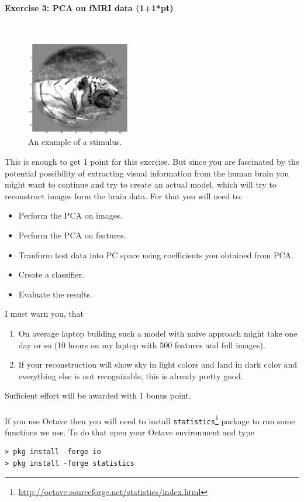 \documentclass[a4paper,11pt]{article}
\newenvironment{exercise}[3]{\paragraph{Exercise #1: #2 (#3pt)}\ \\}{
\medskip}
\begin{document}
\begin{exercise}{3}{PCA on fMRI data}{1+1*}
\begin{figure}[H]
   \centering
   \includegraphics[width=0.4\textwidth]{examplepic.png} 
   \caption{An example of a stimulus.}
   \label{fig:examplepic}
\end{figure}

This is enough to get 1 point for this exercise. But since you are fascinated by the potential possibility of extracting visual information from the human brain you might want to continue and try to create an actual model, which will try to reconstruct images form the brain data. For that you will need to:
\begin{itemize}
\itemsep 0em
	\item Perform the PCA on images.
	\item Perform the PCA on features.
	\item Tranform test data into PC space using coefficients you obtained from PCA.
	\item Create a classifier.
	\item Evaluate the results.
\end{itemize}
I must warn you, that 
\begin{enumerate}
\itemsep 0em
	\item On average laptop building such a model with naive approach might take one day or so (10 hours on my laptop with 500 features and full images).
	\item If your reconstruction will show sky in light colors and land in dark color and everything else is not recognizable, this is already pretty good.
\end{enumerate}
Sufficient effort will be awarded with 1 bonus point.\\
\ \\
If you use Octave then you will need to install \texttt{statistics}\footnote{\url{http://octave.sourceforge.net/statistics/index.html}} package to run some functions we use. To do that open your Octave environment and type
\begin{verbatim}
> pkg install -forge io
> pkg install -forge statistics
\end{verbatim}

\end{exercise}
\end{document}
